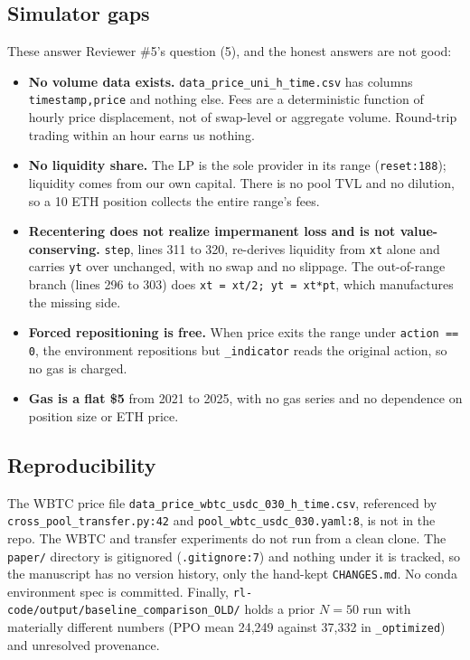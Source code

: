 \documentclass[11pt,a4paper]{article}
\newcommand{\code}[1]{\texttt{\small #1}}
\begin{document}
\subsection{Simulator gaps}

These answer Reviewer \#5's question (5), and the honest answers are not good:

\begin{itemize}
  \item \textbf{No volume data exists.} \code{data\_price\_uni\_h\_time.csv} has columns
        \code{timestamp,price} and nothing else. Fees are a deterministic function of hourly price
        displacement, not of swap-level or aggregate volume. Round-trip trading within an hour
        earns us nothing.
  \item \textbf{No liquidity share.} The LP is the sole provider in its range
        (\code{reset:188}); liquidity comes from our own capital. There is no pool TVL and no
        dilution, so a 10 ETH position collects the entire range's fees.
  \item \textbf{Recentering does not realize impermanent loss and is not value-conserving.}
        \code{step}, lines 311 to 320, re-derives liquidity from \code{xt} alone and carries \code{yt} over
        unchanged, with no swap and no slippage. The out-of-range branch (lines 296 to 303) does
        \code{xt = xt/2; yt = xt*pt}, which manufactures the missing side.
  \item \textbf{Forced repositioning is free.} When price exits the range under \code{action == 0},
        the environment repositions but \code{\_indicator} reads the original action, so no gas is
        charged.
  \item \textbf{Gas is a flat \$5} from 2021 to 2025, with no gas series and no dependence on
        position size or ETH price.
\end{itemize}

\subsection{Reproducibility}

The WBTC price file \code{data\_price\_wbtc\_usdc\_030\_h\_time.csv}, referenced by
\code{cross\_pool\_transfer.py:42} and \code{pool\_wbtc\_usdc\_030.yaml:8}, is not in the
repo. The WBTC and transfer experiments do not run from a clean clone. The \code{paper/} directory
is gitignored (\code{.gitignore:7}) and nothing under it is tracked, so the manuscript has no
version history, only the hand-kept \code{CHANGES.md}. No conda environment spec is committed.
Finally, \code{rl-code/output/baseline\_comparison\_OLD/} holds a prior $N=50$ run with materially
different numbers (PPO mean 24{,}249 against 37{,}332 in \code{\_optimized}) and unresolved
provenance.
\end{document}
